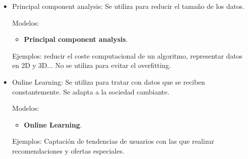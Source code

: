 \documentclass[12pt,a4paper]{article}
\begin{document}
\begin{itemize}
\item Principal component analysis: Se utiliza para reducir el tamaño de los datos.

Modelos:
\begin{itemize}
\item \textbf{Principal component analysis}.
\end{itemize}
Ejemplos: reducir el coste computacional de un algoritmo, representar datos en 2D y 3D... No se utiliza para evitar el overfitting.

\item Online Learning: Se utiliza para tratar con datos que se reciben constantemente. Se adapta a la sociedad cambiante.

Modelos:
\begin{itemize}
\item \textbf{Online Learning}.
\end{itemize}
Ejemplos: Captación de tendencias de usuarios con las que realizar recomendaciones y ofertas especiales.
\end{itemize}

\newpage
\end{document}
